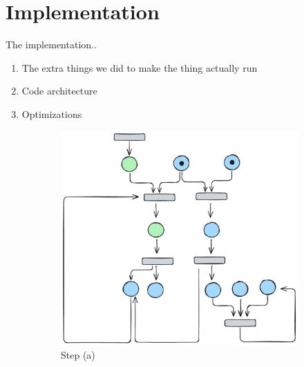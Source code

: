 

\section{Implementation}
\label{sec:implementation}

The implementation..

\begin{enumerate}
	\item The extra things we did to make the thing actually run
	\item Code architecture
	\item Optimizations
\end{enumerate}


\begin{figure}[htbp]
	\centering
	
	\begin{subfigure}[b]{0.45\textwidth}
		\centering
		\includegraphics[width=\textwidth]{plots/bidirectional_pruning_step_a_init.pdf}
		\caption{Step (a)}\label{fig:step:a}
	\end{subfigure}\hfill
	\begin{subfigure}[b]{0.45\textwidth}
		\centering

\end{subfigure}
\end{figure}
